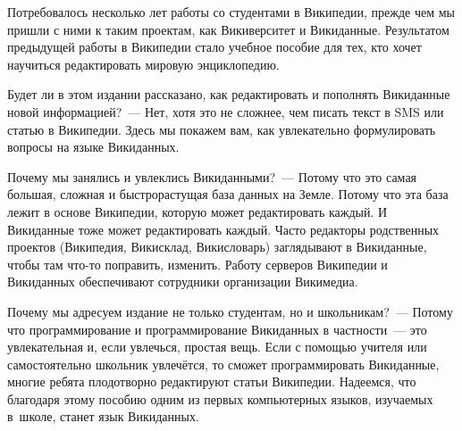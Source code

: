 
Потребовалось несколько лет работы со студентами в Википедии, прежде чем мы пришли с ними к таким проектам, 
как Викиверситет и Викиданные. 
Результатом предыдущей работы в Википедии стало учебное пособие для тех, 
кто хочет научиться редактировать мировую энциклопедию.



Будет ли в этом издании рассказано, 
как редактировать и пополнять Викиданные новой информацией?~--- Нет, 
хотя это не сложнее, чем писать текст в SMS или статью в Википедии. 
Здесь мы покажем вам, как увлекательно формулировать вопросы на языке Викиданных. 


Почему мы занялись и увлеклись Викиданными?~--- Потому что это самая большая, сложная 
и быстрорастущая база данных на Земле. 
Потому что эта база лежит в основе Википедии, которую может редактировать каждый.
И Викиданные тоже может редактировать каждый. 
Часто редакторы родственных проектов (Википедия, Викисклад, Викисловарь) 
заглядывают в Викиданные, чтобы там что-то поправить, изменить. 
Работу серверов Википедии и Викиданных обеспечивают сотрудники организации Викимедиа. 



Почему мы адресуем издание не только студентам, но и школьникам?~--- Потому что 
программирование и программирование Викиданных в частности~--- это 
увлекательная и, если увлечься, простая вещь. 
Если с помощью учителя или самостоятельно школьник увлечётся, 
то сможет программировать Викиданные, 
многие ребята плодотворно редактируют статьи Википедии. 
Надеемся, что благодаря этому пособию одним из первых компьютерных языков, 
изучаемых в~школе, станет язык Викиданных.



